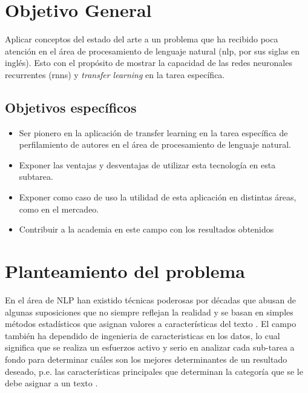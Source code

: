 
\section{Objetivo General}

Aplicar conceptos del estado del arte a un problema que ha recibido poca atención en el área de \gls{procesamiento de lenguaje natural} (\gls{nlp}, por sus siglas en inglés). Esto con el propósito de mostrar la capacidad de las redes neuronales recurrentes (\glspl{rnn}) y \textit{\gls{transfer learning}} en la tarea específica.

\subsection{Objetivos específicos}

\begin{itemize}
\item Ser pionero en la aplicación de transfer learning en la tarea específica de perfilamiento de autores en el área de procesamiento de lenguaje natural.
\item Exponer las ventajas y desventajas de utilizar esta tecnología en esta subtarea.
\item Exponer como caso de uso la utilidad de esta aplicación en distintas áreas, como en el mercadeo.
\item Contribuir a la academia en este campo con los resultados obtenidos
\end{itemize}


\section{Planteamiento del problema}

En el área de NLP han existido técnicas poderosas por décadas que abusan de algunas suposiciones que no siempre reflejan la realidad y se basan en simples métodos estadísticos que asignan valores a características del texto \parencite{Edmundson1969, kupiec1995trainable}. El campo también ha dependido de \gls{ingenieria de caracteristicas} en los datos, lo cual significa que se realiza un esfuerzos activo y serio en analizar cada sub-tarea a fondo para determinar cuáles son los mejores determinantes de un resultado deseado, p.e. las características principales que determinan la categoría que se le debe asignar a un texto \parencite{aggarwal2012mining}.

